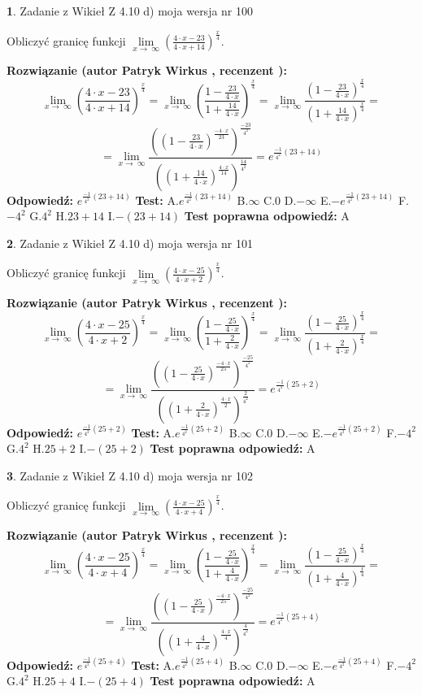 \documentclass[12pt, a4paper]{article}
\theoremstyle{definition} %
\newtheorem{zad}{}
\newcommand{\zadStart}[1]{\begin{zad}#1\newline}
\newcommand{\zadStop}{\end{zad}}
\newcommand{\rozwStart}[2]{\noindent \textbf{Rozwiązanie (autor #1 , recenzent #2): }\newline}
\newcommand{\rozwStop}{\newline}
\newcommand{\odpStart}{\noindent \textbf{Odpowiedź:}\newline}
\newcommand{\odpStop}{\newline}
\newcommand{\testStart}{\noindent \textbf{Test:}\newline}
\newcommand{\testStop}{\newline}
\newcommand{\kluczStart}{\noindent \textbf{Test poprawna odpowiedź:}\newline}
\newcommand{\kluczStop}{\newline}
\begin{document}
\zadStart{Zadanie z Wikieł Z 4.10 d) moja wersja nr 100}


Obliczyć granicę funkcji  $\lim\limits_{x\to\ \infty}(\frac{4\cdot x-23}{4\cdot x+14})^{\frac{x}{4}}$.
\zadStop
\rozwStart{Patryk Wirkus}{}
$$\lim\limits_{x\to\ \infty}(\frac{4\cdot x-23}{4\cdot x+14})^{\frac{x}{4}} = \lim\limits_{x\to\ \infty}(\frac{1-\frac{23}{4\cdot x}}{1+\frac{14}{4\cdot x}})^{\frac{x}{4}}=\lim\limits_{x\to\ \infty}\frac{(1-\frac{23}{4\cdot x})^{\frac{x}{4}}}{(1+\frac{14}{4\cdot x})^{\frac{x}{4}}}=$$
$$=\lim\limits_{x\to\ \infty}\frac{((1-\frac{23}{4\cdot x})^{\frac{-4\cdot x}{23}})^{\frac{-23}{4^{2}}}}{((1+\frac{14}{4\cdot x})^{\frac{4\cdot x}{14}})^{\frac{14}{4^{2}}}}=e^{\frac{-1}{4^{2}}(23+14)}$$
\rozwStop
\odpStart
$e^{\frac{-1}{4^{2}}(23+14)}$
\odpStop
\testStart
A.$e^{\frac{-1}{4^{2}}(23+14)}$ B.$\infty$ C.$0$ D.$-\infty$ E.$-e^{\frac{-1}{4^{2}}(23+14)}$
F.$-4^{2}$ G.$4^{2}$
H.$23+14$
I.$-(23+14)$
\testStop
\kluczStart
A
\kluczStop



\zadStart{Zadanie z Wikieł Z 4.10 d) moja wersja nr 101}


Obliczyć granicę funkcji  $\lim\limits_{x\to\ \infty}(\frac{4\cdot x-25}{4\cdot x+2})^{\frac{x}{4}}$.
\zadStop
\rozwStart{Patryk Wirkus}{}
$$\lim\limits_{x\to\ \infty}(\frac{4\cdot x-25}{4\cdot x+2})^{\frac{x}{4}} = \lim\limits_{x\to\ \infty}(\frac{1-\frac{25}{4\cdot x}}{1+\frac{2}{4\cdot x}})^{\frac{x}{4}}=\lim\limits_{x\to\ \infty}\frac{(1-\frac{25}{4\cdot x})^{\frac{x}{4}}}{(1+\frac{2}{4\cdot x})^{\frac{x}{4}}}=$$
$$=\lim\limits_{x\to\ \infty}\frac{((1-\frac{25}{4\cdot x})^{\frac{-4\cdot x}{25}})^{\frac{-25}{4^{2}}}}{((1+\frac{2}{4\cdot x})^{\frac{4\cdot x}{2}})^{\frac{2}{4^{2}}}}=e^{\frac{-1}{4^{2}}(25+2)}$$
\rozwStop
\odpStart
$e^{\frac{-1}{4^{2}}(25+2)}$
\odpStop
\testStart
A.$e^{\frac{-1}{4^{2}}(25+2)}$ B.$\infty$ C.$0$ D.$-\infty$ E.$-e^{\frac{-1}{4^{2}}(25+2)}$
F.$-4^{2}$ G.$4^{2}$
H.$25+2$
I.$-(25+2)$
\testStop
\kluczStart
A
\kluczStop



\zadStart{Zadanie z Wikieł Z 4.10 d) moja wersja nr 102}


Obliczyć granicę funkcji  $\lim\limits_{x\to\ \infty}(\frac{4\cdot x-25}{4\cdot x+4})^{\frac{x}{4}}$.
\zadStop
\rozwStart{Patryk Wirkus}{}
$$\lim\limits_{x\to\ \infty}(\frac{4\cdot x-25}{4\cdot x+4})^{\frac{x}{4}} = \lim\limits_{x\to\ \infty}(\frac{1-\frac{25}{4\cdot x}}{1+\frac{4}{4\cdot x}})^{\frac{x}{4}}=\lim\limits_{x\to\ \infty}\frac{(1-\frac{25}{4\cdot x})^{\frac{x}{4}}}{(1+\frac{4}{4\cdot x})^{\frac{x}{4}}}=$$
$$=\lim\limits_{x\to\ \infty}\frac{((1-\frac{25}{4\cdot x})^{\frac{-4\cdot x}{25}})^{\frac{-25}{4^{2}}}}{((1+\frac{4}{4\cdot x})^{\frac{4\cdot x}{4}})^{\frac{4}{4^{2}}}}=e^{\frac{-1}{4^{2}}(25+4)}$$
\rozwStop
\odpStart
$e^{\frac{-1}{4^{2}}(25+4)}$
\odpStop
\testStart
A.$e^{\frac{-1}{4^{2}}(25+4)}$ B.$\infty$ C.$0$ D.$-\infty$ E.$-e^{\frac{-1}{4^{2}}(25+4)}$
F.$-4^{2}$ G.$4^{2}$
H.$25+4$
I.$-(25+4)$
\testStop
\kluczStart
A
\kluczStop
\end{document}
